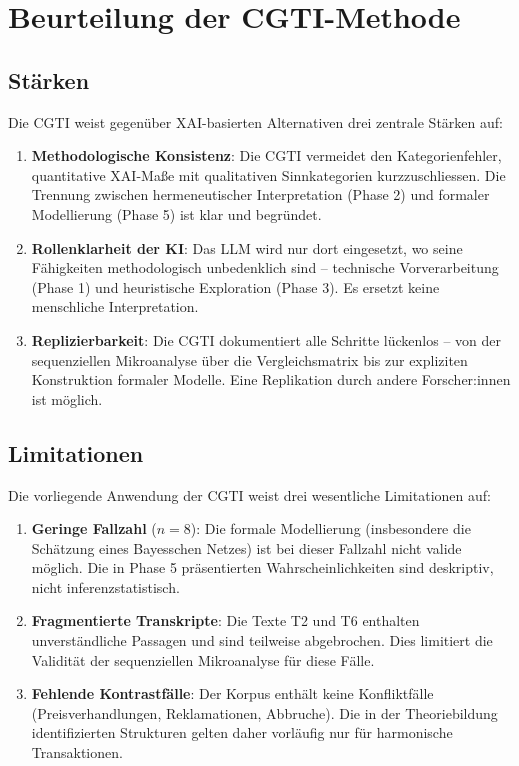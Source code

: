 \documentclass[12pt,a4paper]{article}
\begin{document}
\section{Beurteilung der CGTI-Methode}

\subsection{Stärken}

Die CGTI weist gegenüber XAI-basierten Alternativen drei zentrale Stärken auf:

\begin{enumerate}
    \item \textbf{Methodologische Konsistenz}: Die CGTI vermeidet den Kategorienfehler, quantitative XAI-Maße mit qualitativen Sinnkategorien kurzzuschliessen. Die Trennung zwischen hermeneutischer Interpretation (Phase 2) und formaler Modellierung (Phase 5) ist klar und begründet.
    
    \item \textbf{Rollenklarheit der KI}: Das LLM wird nur dort eingesetzt, wo seine Fähigkeiten methodologisch unbedenklich sind – technische Vorverarbeitung (Phase 1) und heuristische Exploration (Phase 3). Es ersetzt keine menschliche Interpretation.
    
    \item \textbf{Replizierbarkeit}: Die CGTI dokumentiert alle Schritte lückenlos – von der sequenziellen Mikroanalyse über die Vergleichsmatrix bis zur expliziten Konstruktion formaler Modelle. Eine Replikation durch andere Forscher:innen ist möglich.
\end{enumerate}

\subsection{Limitationen}

Die vorliegende Anwendung der CGTI weist drei wesentliche Limitationen auf:

\begin{enumerate}
    \item \textbf{Geringe Fallzahl} ($n=8$): Die formale Modellierung (insbesondere die Schätzung eines Bayesschen Netzes) ist bei dieser Fallzahl nicht valide möglich. Die in Phase 5 präsentierten Wahrscheinlichkeiten sind deskriptiv, nicht inferenzstatistisch.
    
    \item \textbf{Fragmentierte Transkripte}: Die Texte T2 und T6 enthalten unverständliche Passagen und sind teilweise abgebrochen. Dies limitiert die Validität der sequenziellen Mikroanalyse für diese Fälle.
    
    \item \textbf{Fehlende Kontrastfälle}: Der Korpus enthält keine Konfliktfälle (Preisverhandlungen, Reklamationen, Abbruche). Die in der Theoriebildung identifizierten Strukturen gelten daher vorläufig nur für harmonische Transaktionen.
\end{enumerate}
\end{document}
